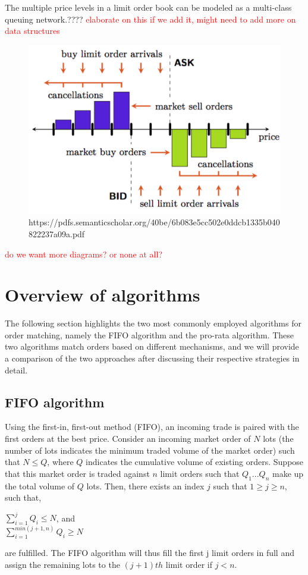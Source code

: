 \documentclass{article}
\newcommand{\todo}{\textcolor{red}}
\begin{document}
The multiple price levels in a limit order book can be modeled as a multi-class queuing network.???? \todo{elaborate on this if we add it, might need to add more on data structures} \\
	\begin{figure}[h]
		\centering
		\includegraphics[width=0.5\linewidth]{chart.png}
		\caption{https://pdfs.semanticscholar.org/40be/6b083e5cc502e0ddcb1335b040822237a09a.pdf}
		\label{fig}
	\end{figure}

\todo{do we want more diagrams? or none at all?}

\section{Overview of algorithms}
The following section highlights the two most commonly employed algorithms for order matching, namely the FIFO  algorithm and the pro-rata algorithm. These two algorithms match orders based on different mechanisms, and we will provide a comparison of the two approaches after discussing their respective strategies in detail.

\subsection{FIFO algorithm}
Using the first-in, first-out method (FIFO), an incoming trade is paired with the first orders at the best price.
Consider an incoming market order of $N$ lots (the number of lots indicates the minimum traded volume of the market order) such that $N\leq Q$, where $Q$ indicates the cumulative volume of existing orders. Suppose that this market order is traded against $n$ limit orders such that $Q_1... Q_n$ make up the total volume of $Q$ lots. Then, there exists an index $j$ such that $1\geq j \geq n$, such that,
\begin{center}
    $\sum_{i=1}^j Q_i \leq N$, and\\
    $\sum_{i=1}^{min(j+1, n)} Q_i \geq N$
\end{center}
are fulfilled. The FIFO algorithm will thus fill the first j limit orders in full and assign the remaining lots to the $(j + 1)th$ limit order if $j < n$.
\end{document}
